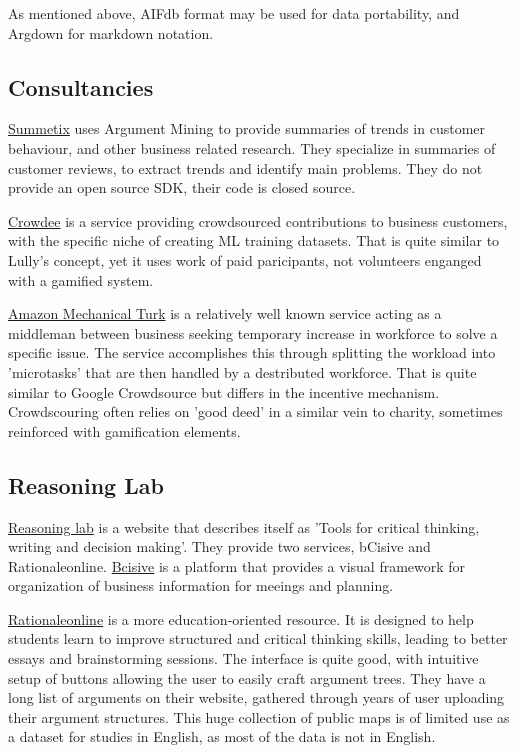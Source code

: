 \documentclass{report}
\begin{document}
As mentioned above, AIFdb format may be used for data portability, and Argdown for markdown notation.


\subsection{Consultancies}
\href{https://www.summetix.com/}{Summetix} uses Argument Mining to provide summaries of trends in customer behaviour, and other business related research. They specialize in summaries of customer reviews, to extract trends and identify main problems. They do not provide an open source SDK, their code is closed source.

\href{https://www.crowdee.com/}{Crowdee} is a service providing crowdsourced contributions to business customers, with the specific niche of creating ML training datasets. That is quite similar to Lully's concept, yet it uses work of paid paricipants, not volunteers enganged with a gamified system.

\href{https://www.mturk.com/}{Amazon Mechanical Turk} is a relatively well known service acting as a middleman between business seeking temporary increase in workforce to solve a specific issue.
The service accomplishes this through splitting the workload into 'microtasks' that are then handled by a destributed workforce. That is quite similar to Google Crowdsource but differs in the incentive mechanism. Crowdscouring often relies on 'good deed' in a similar vein to charity, sometimes reinforced with gamification elements.

\subsection{Reasoning Lab}
\href{https://www.reasoninglab.com/argument-mapping/}{Reasoning lab} is a website that describes itself as 'Tools for critical thinking, writing and decision making'. They provide two services, bCisive and Rationaleonline.
\href{https://www.reasoninglab.com/bcisive-2/}{Bcisive} is a platform that provides a visual framework for organization of business information for meeings and planning.

\href{https://www.rationaleonline.com/browse/all}{Rationaleonline} is a more education-oriented resource. It is designed to help students learn to improve structured and critical thinking skills, leading to better essays and brainstorming sessions.
The interface is quite good, with intuitive setup of buttons allowing the user to easily craft argument trees.
They have a long list of arguments on their website, gathered through years of user uploading their argument structures.
This huge collection of public maps is of limited use as a dataset for studies in English, as most of the data is not in English.
\end{document}
